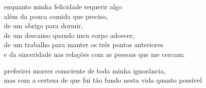 enquanto minha felicidade requerir algo\\
além da pouca comida que preciso,\\
de um abrigo para dormir,\\
de um descanso quando meu corpo adoecer,\\
de um trabalho para manter os três pontos anteriores\\
e da sinceridade nas relações com as pessoas que me cercam;

preferirei morrer consciente de toda minha ignorância,\\
mas com a certeza de que fui tão fundo nesta vida quanto possível
